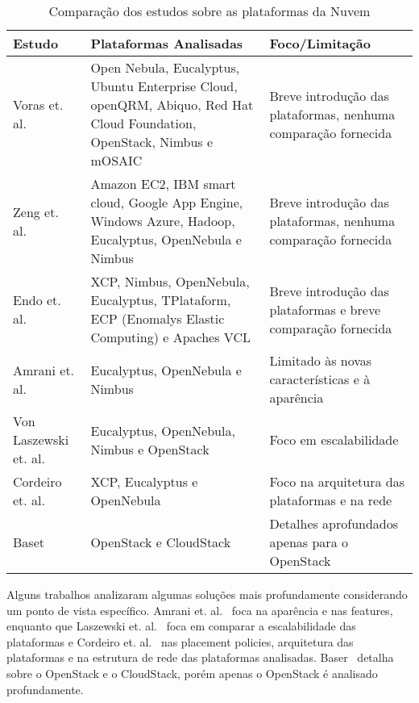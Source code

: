 \begin{table}
  \begin{center}
    \caption{Comparação dos estudos sobre as plataformas da Nuvem}\label{researchesTable}
    \begin{tabular}{|p{4cm}|p{6cm}|p{5cm}|}
      \hline
      Estudo & Plataformas Analisadas & Foco/Limitação\\
      \hline
      {\small Voras et. al.~\citeyearpar{Voras:2011}} & {\small Open Nebula, Eucalyptus, Ubuntu Enterprise Cloud, openQRM, Abiquo, Red Hat Cloud Foundation, OpenStack, Nimbus e mOSAIC} & {\small Breve introdução das plataformas, nenhuma comparação fornecida}\\
      \hline
      {\small Zeng et. al.~\citeyearpar{Zeng:2012}} & {\small Amazon EC2, IBM smart cloud, Google App Engine, Windows Azure, Hadoop, Eucalyptus, OpenNebula e Nimbus} & {\small Breve introdução das plataformas, nenhuma comparação fornecida}\\
      \hline
      {\small Endo et. al.~\citeyearpar{Endo:2010}} & {\small XCP, Nimbus, OpenNebula, Eucalyptus, TPlataform, ECP (Enomalys Elastic Computing) e Apaches VCL} & {\small Breve introdução das plataformas e breve comparação fornecida}\\
      \hline
      {\small Amrani et. al.~\citeyearpar{Amrani:2012}} & {\small Eucalyptus, OpenNebula e Nimbus} & {\small Limitado às novas características e à aparência}\\
      \hline
      {\small Von Laszewski et. al.~\citeyearpar{Laszewski:2012}} & {\small Eucalyptus, OpenNebula, Nimbus e OpenStack} & {\small Foco em escalabilidade}\\
      \hline
      {\small Cordeiro et. al.~\citeyearpar{Cordeiro:2010}} & {\small XCP, Eucalyptus e OpenNebula} & {\small Foco na arquitetura das plataformas e na rede}\\
      \hline
      {\small Baset~\citeyearpar{Baset:2012}} & {\small OpenStack e CloudStack} & {\small Detalhes aprofundados apenas para o OpenStack}\\
      \hline
    \end{tabular}
  \end{center}
\end{table}

Alguns trabalhos analizaram algumas soluções mais profundamente considerando um ponto de vista específico. Amrani et. al.~\citeyearpar{Amrani:2012} foca na aparência e nas features, enquanto que Laszewski et. al.~\citeyearpar{Laszewski:2012} foca em comparar a escalabilidade das plataformas e Cordeiro et. al.~\citeyearpar{Cordeiro:2010} nas placement policies, arquitetura das plataformas e na estrutura de rede das plataformas analisadas. Baser~\citeyearpar{Baset:2012} detalha sobre o OpenStack e o CloudStack, porém apenas o OpenStack é analisado profundamente.

